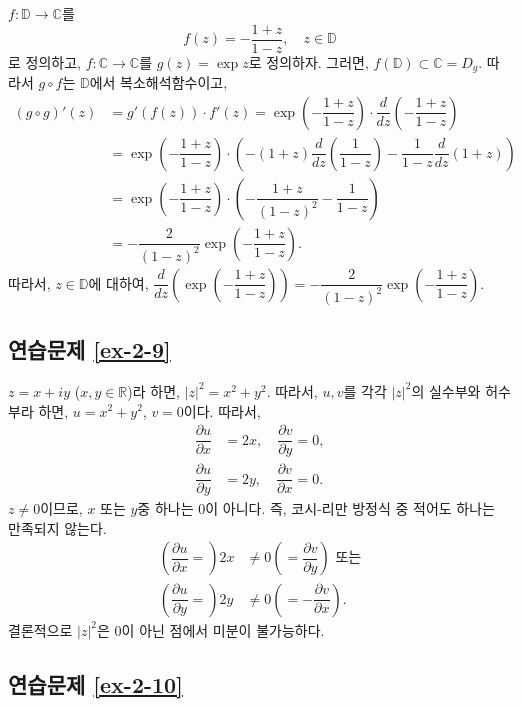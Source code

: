 $f: \mathbb D \to \mathbb C$를 
\[
f(z) = -\dfrac{1+z}{1-z},\quad z\in \mathbb D
\]
로 정의하고, $f: \mathbb C \to \mathbb C$를 $g(z)= \exp z$로 정의하자.
그러면, $f(\mathbb D) \subset \mathbb C = D_g$.
따라서 $g\circ f$는 $\mathbb D$에서 복소해석함수이고,
\begin{align*}
(g\circ g)'(z) &= g'(f(z))\cdot f'(z) 
= \exp\left( - \dfrac{1+z}{1-z}\right) \cdot \dfrac d{dz}\left( - \dfrac{1+z}{1-z}\right) \\
&= \exp\left( - \dfrac{1+z}{1-z}\right)\cdot \left(
-(1+z)\dfrac d{dz} \left(\dfrac1{1-z}\right) - \dfrac1{1-z}\dfrac d {dz}(1+z)\right) \\
&= \exp\left( - \dfrac{1+z}{1-z}\right) \cdot \left(
-\dfrac{1+z}{(1-z)^2} - \dfrac1{1-z} \right) \\
&= - \dfrac2{(1-z)^2} \exp\left( - \dfrac{1+z}{1-z}\right).
\end{align*}
따라서, $z\in\mathbb D$에 대하여,
$\dfrac d{dz} \left( \exp\left( - \dfrac{1+z}{1-z}\right) \right)
=  - \dfrac2{(1-z)^2} \exp\left( - \dfrac{1+z}{1-z}\right)$.

\subsection*{연습문제 \ref{ex-2-9}}

$z = x+iy$ ($x,y\in\mathbb R$)라 하면,
$|z|^2 = x^2+y^2$.
따라서, $u, v$를 각각 $|z|^2$의 실수부와 허수부라 하면,
$u=x^2+y^2$, $v=0$이다. 따라서,
\begin{align*}
\dfrac{\partial u}{\partial x} &=2x, \quad \dfrac{\partial v}{\partial y} = 0, \\
\dfrac{\partial u}{\partial y} &=2y, \quad \dfrac{\partial v}{\partial x} = 0.
\end{align*}
$z\ne0$이므로, $x$ 또는 $y$중 하나는 $0$이 아니다.
즉, 코시-리만 방정식 중 적어도 하나는 만족되지 않는다.
\begin{align*}
\left( \dfrac{\partial u}{\partial x} = \right) 2x &\ne 0 
\left( = \dfrac{\partial v}{\partial y} \right) \text{ 또는} \\
\left( \dfrac{\partial u}{\partial y} = \right) 2y &\ne 0 
\left( = - \dfrac{\partial v}{\partial x} \right).
\end{align*}
결론적으로 $|z|^2$은 $0$이 아닌 점에서 미분이 불가능하다.

\subsection*{연습문제 \ref{ex-2-10}}

